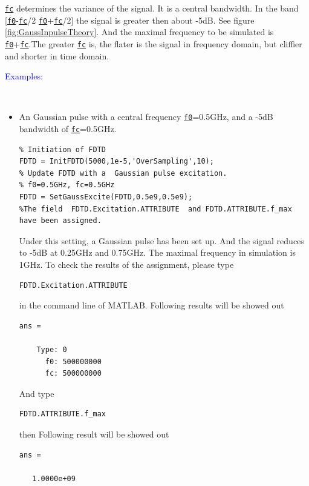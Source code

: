 	    \begin{myindentpar}
		\hyperref[para:fc]{\texttt{fc}} determines the variance of the signal. It is a central bandwidth. In the band [\hyperref[para:f0]{\texttt{f0}}-\hyperref[para:fc]{\texttt{fc}}/2 \quad \hyperref[para:f0]{\texttt{f0}}+\hyperref[para:fc]{\texttt{fc}}/2] the signal is greater then about -5dB. See figure \ref{fig:GaussInpulseTheory}. And the maximal frequency to be simulated is \hyperref[para:f0]{\texttt{f0}}+\hyperref[para:fc]{\texttt{fc}}.The greater \hyperref[para:fc]{\texttt{fc}} is, the flater is the signal in frequency domain, but cliffier and shorter in time domain.
	    \end{myindentpar}

	\textcolor{blue}{\begin{large}Examples:\end{large}}\\
\begin{itemize}
\item An Gaussian pulse with a central frequency \hyperref[para:f0]{\texttt{f0}}=0.5GHz, and a -5dB bandwidth of \hyperref[para:fc]{\texttt{fc}}=0.5GHz. 
\begin{lstlisting}
% Initiation of FDTD 
FDTD = InitFDTD(5000,1e-5,'OverSampling',10);
% Update FDTD with a  Gaussian pulse excitation. 
% f0=0.5GHz, fc=0.5GHz
FDTD = SetGaussExcite(FDTD,0.5e9,0.5e9);
%The field  FDTD.Excitation.ATTRIBUTE  and FDTD.ATTRIBUTE.f_max have been assigned.
\end{lstlisting}
Under this setting, a Gaussian pulse has been set up. And the signal reduces to -5dB at 0.25GHz and 0.75GHz. The maximal frequency in simulation is 1GHz.
To check the results of the assignment, please type 
\begin{lstlisting}
FDTD.Excitation.ATTRIBUTE
\end{lstlisting}
in the command line of MATLAB. Following results will be showed out
\begin{lstlisting}
ans = 

    Type: 0
      f0: 500000000
      fc: 500000000
\end{lstlisting}
And type
\begin{lstlisting}
FDTD.ATTRIBUTE.f_max
\end{lstlisting}
then Following result will be showed out
\begin{lstlisting}
ans =

   1.0000e+09
\end{lstlisting}
\end{itemize}

